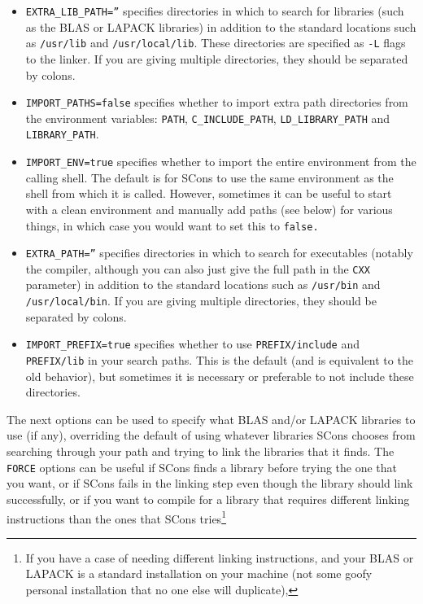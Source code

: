 \begin{enumerate}
\begin{itemize}
\item \texttt{EXTRA\_LIB\_PATH=''} specifies directories in which to search for libraries
(such as the BLAS or LAPACK libraries)
in addition to the standard locations such as \texttt{/usr/lib} and \texttt{/usr/local/lib}.  
These directories are specified as \texttt{-L} flags to the linker.
If you are giving multiple directories, they should be separated by colons.
\item \texttt{IMPORT\_PATHS=false} specifies whether to import extra path directories from the environment variables: 
\texttt{PATH}, \texttt{C\_INCLUDE\_PATH}, \texttt{LD\_LIBRARY\_PATH} and \texttt{LIBRARY\_PATH}.
\item \texttt{IMPORT\_ENV=true} specifies whether to import the entire environment from the calling shell.
The default is for SCons to use the same environment as the shell from which it is called.  However, sometimes it can be useful to start with a clean environment and manually add paths (see below) for various things, in which case you would want to set this to \tt{false}.
\item \texttt{EXTRA\_PATH=''} specifies directories in which to search for executables (notably the compiler, although you can also just give the full path in the \texttt{CXX} parameter)
in addition to the standard locations such as \texttt{/usr/bin} and \texttt{/usr/local/bin}.
If you are giving multiple directories, they should be separated by colons.
\item \texttt{IMPORT\_PREFIX=true} specifies whether to use \texttt{PREFIX/include} and \texttt{PREFIX/lib} in your search paths.  This is the default (and is equivalent to the old behavior), but sometimes it is necessary or preferable to not include these directories.
\end{itemize}
The next options can be used to specify what BLAS and/or LAPACK libraries to use (if any),
overriding the default of using whatever libraries SCons chooses from searching through your path
and trying to link the libraries that it finds.  The \texttt{FORCE} options can be useful if SCons finds
a library before trying the one that you want, or if SCons fails in the linking step even though
the library should link successfully, or if
you want to compile for a library that requires different linking instructions than the 
ones that SCons tries\footnote{
If you have a case of needing different linking instructions, and your BLAS or LAPACK is a standard
installation on your machine (not some goofy personal installation that no one else will duplicate),
}
\end{enumerate}
